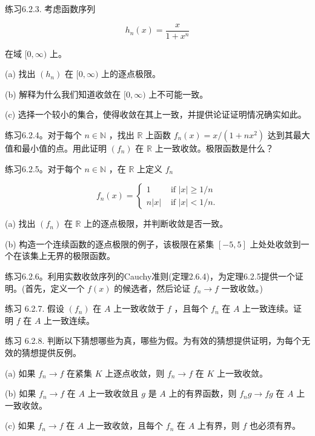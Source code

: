 练习6.2.3. 考虑函数序列

\[
{h}_{n}\left( x\right)  = \frac{x}{1 + {x}^{n}}
\]

在域 \(\lbrack 0,\infty )\) 上。

(a) 找出 \(\left( {h}_{n}\right)\) 在 \(\lbrack 0,\infty )\) 上的逐点极限。

(b) 解释为什么我们知道收敛在 \(\lbrack 0,\infty )\) 上不可能一致。

(c) 选择一个较小的集合，使得收敛在其上一致，并提供论证证明情况确实如此。

练习6.2.4。对于每个 \(n \in  \mathbb{N}\) ，找出 \(\mathbb{R}\) 上函数 \({f}_{n}\left( x\right)  = x/\left( {1 + n{x}^{2}}\right)\) 达到其最大值和最小值的点。用此证明 \(\left( {f}_{n}\right)\) 在 \(\mathbb{R}\) 上一致收敛。极限函数是什么？

练习6.2.5。对于每个 \(n \in  \mathbb{N}\) ，在 \(\mathbb{R}\) 上定义 \({f}_{n}\)

\[
{f}_{n}\left( x\right)  = \left\{  \begin{array}{ll} 1 & \text{ if }\left| x\right|  \geq  1/n \\  n\left| x\right| & \text{ if }\left| x\right|  < 1/n. \end{array}\right.
\]

(a) 找出 \(\left( {f}_{n}\right)\) 在 \(\mathbb{R}\) 上的逐点极限，并判断收敛是否一致。

(b) 构造一个连续函数的逐点极限的例子，该极限在紧集 \(\left\lbrack  {-5,5}\right\rbrack\) 上处处收敛到一个在该集上无界的极限函数。

练习6.2.6。利用实数收敛序列的Cauchy准则(定理2.6.4)，为定理6.2.5提供一个证明。(首先，定义一个 \(f\left( x\right)\) 的候选者，然后论证 \({f}_{n} \rightarrow  f\) 一致收敛。)

练习 6.2.7. 假设 \(\left( {f}_{n}\right)\) 在 \(A\) 上一致收敛于 \(f\) ，且每个 \({f}_{n}\) 在 \(A\) 上一致连续。证明 \(f\) 在 \(A\) 上一致连续。

练习 6.2.8. 判断以下猜想哪些为真，哪些为假。为有效的猜想提供证明，为每个无效的猜想提供反例。

(a) 如果 \({f}_{n} \rightarrow  f\) 在紧集 \(K\) 上逐点收敛，则 \({f}_{n} \rightarrow  f\) 在 \(K\) 上一致收敛。

(b) 如果 \({f}_{n} \rightarrow  f\) 在 \(A\) 上一致收敛且 \(g\) 是 \(A\) 上的有界函数，则 \({f}_{n}g \rightarrow  {fg}\) 在 \(A\) 上一致收敛。

(c) 如果 \({f}_{n} \rightarrow  f\) 在 \(A\) 上一致收敛，且每个 \({f}_{n}\) 在 \(A\) 上有界，则 \(f\) 也必须有界。

